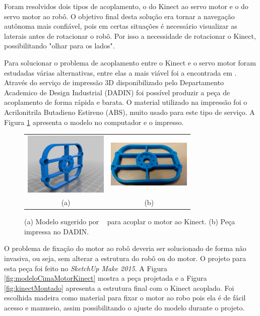 
Foram resolvidos dois tipos de acoplamento, o do Kinect ao servo motor e o do servo motor ao robô. O objetivo final desta solução era tornar a navegação autônoma mais confiável, pois em certas situações é necessário visualizar as laterais antes de rotacionar o robô. Por isso a necessidade de rotacionar o Kinect, possibilitando "olhar para os lados".

Para solucionar o problema de acoplamento entre o Kinect e o servo motor foram estudadas várias alternativas, entre elas a mais viável foi a encontrada em \cite{modelo3DMotorKinect}. Através do serviço de impressão 3D disponibilizado pelo Departamento Academico de Design Industrial (DADIN) foi possível produzir a peça de acoplamento de forma rápida e barata. O material utilizado na impressão foi o Acrilonitrila Butadieno Estireno (ABS), muito usado para este tipo de serviço. A Figura \ref{fig:modeloMotorKinect} apresenta o modelo no computador e o impresso.

\begin{figure}[H]
\centering
\begin{tabular}{cc}
  \includegraphics[width=4cm, height=3cm]{images/modeloMotorKinect.jpg} &
  \includegraphics[width=4cm, height=3cm]{images/acoplamentoMotor.jpg} \\
 (a) & (b)
\end{tabular} 
\caption{\small{(a) Modelo sugerido por ~\cite{modelo3DMotorKinect} para acoplar o motor ao Kinect. (b) Peça impressa no DADIN.}}
\label{fig:modeloMotorKinect}
\end{figure} 

O problema de fixação do motor ao robô deveria ser solucionado de forma não invasiva, ou seja, sem alterar a estrutura do robô ou do motor. O projeto para esta peça foi feito no \textit{SketchUp Make 2015}. A Figura \ref{fig:modeloCimaMotorKinect} mostra a peça projetada e a Figura \ref{fig:kinectMontado} apresenta a estrutura final com o Kinect acoplado. Foi escolhida madeira como material para fixar o motor ao robo pois ela é de fácil acesso e manuseio, assim possibilitando o ajuste do modelo durante o projeto.

